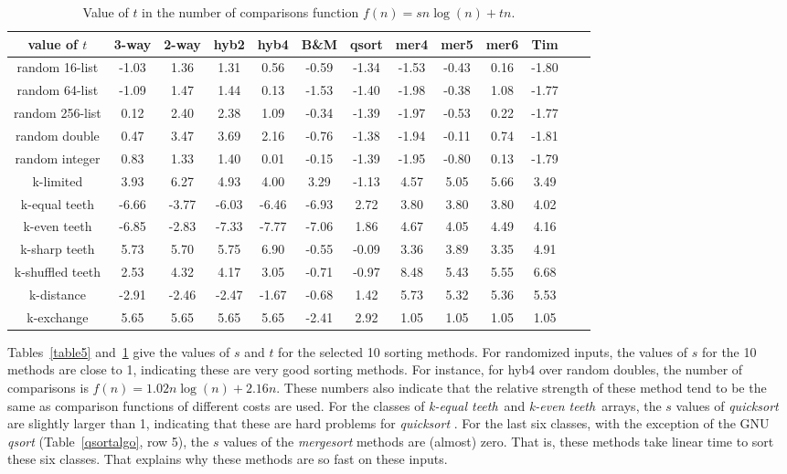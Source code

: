 \documentclass[AMA,STIX1COL]{WileyNJD-v2}
\newcommand{\keq}{\emph{k-equal teeth}}
\newcommand{\kev}{\emph{k-even teeth}}
\newcommand{\qusort}{\emph{quicksort }}
\newcommand{\qsort}{\emph{qsort }}
\newcommand{\msort}{\emph{mergesort }}
\begin{document}
\begin{table}
\caption{Value of $t$ in the number of comparisons function $f(n) = sn\log(n) + tn$.}
\centering
\begin{tabular}{|c|c|c|c|c|c|c|c|c|c|c|c|c|}
\toprule
value of $t$ & 3-way & 2-way & hyb2 & hyb4 & B\&M& qsort & mer4 & mer5 & mer6 & Tim \\
\midrule
random 16-list	&-1.03	&1.36	&1.31	&0.56	&-0.59	&-1.34	&-1.53	&-0.43	&0.16&	-1.80\\
random 64-list&-1.09&	1.47&	1.44&	0.13&	-1.53&	-1.40&	-1.98&	-0.38&	1.08&	-1.77\\
random 256-list&0.12	&2.40	&2.38	&1.09	&-0.34	&-1.39	&-1.97	&-0.53	&0.22	&-1.77\\
random double&0.47&	 3.47&	 3.69& 	2.16&	-0.76	 &-1.38&	-1.94&	-0.11&	0.74&	-1.81\\
random integer&0.83& 	1.33&	1.40&	0.01&	-0.15&	-1.39&	-1.95&	-0.80&	0.13&	-1.79\\
k-limited&	3.93	&6.27	&4.93	&4.00	&3.29	&-1.13	&4.57	&5.05	&5.66	&3.49\\
k-equal teeth&	-6.66	& -3.77&	-6.03&	-6.46&	-6.93&	2.72&	3.80&	3.80&	3.80&	4.02\\
k-even teeth&	-6.85	& -2.83	 &-7.33	&-7.77	&-7.06	&1.86	&4.67	&4.05	&4.49	&4.16\\
k-sharp teeth&	5.73	&5.70&	5.75&	6.90&	-0.55&	-0.09&	3.36&	3.89&	3.35&	4.91\\
k-shuffled teeth&2.53	&4.32	&4.17	&3.05	&-0.71	&-0.97	&8.48	&5.43	&5.55	&6.68\\
k-distance&-2.91&	-2.46&	-2.47&	-1.67&	-0.68&	1.42&	5.73&	5.32&	5.36&	5.53\\
k-exchange&	5.65	&5.65	&5.65	&5.65	&-2.41	&2.92	&1.05	&1.05	&1.05	&1.05\\
\bottomrule
\end{tabular}
\label{table6}
\end{table}

Tables~\ref{table5} and~\ref{table6} give the values of $s$ and $t$ for the selected 10 sorting methods. 
For randomized inputs, the values of $s$ for the 10 methods are close to 1, indicating these are very good sorting methods. 
For instance, for hyb4 over random doubles, the number of comparisons is $f(n) = 1.02n\log(n) + 2.16n$. 
These numbers also indicate that the relative strength of these method tend to be the same as comparison functions of different costs are used. 
For the classes of \keq\ and \kev\ arrays, the $s$ values of \qusort are slightly larger than 1, indicating that these are hard problems for \qusort. 
For the last six classes, with the exception of the GNU \qsort (Table~\ref{qsortalgo}, row 5), the $s$ values of the \msort methods are (almost) zero. 
That is, these methods take linear time to sort these six classes.  
That explains why these methods are so fast on these inputs.
\end{document}

